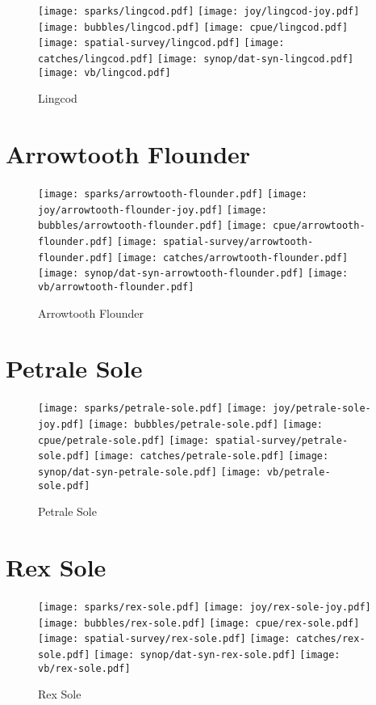 \begin{figure}[htbp]
\centering
\texttt{[image: sparks/lingcod.pdf]}
\texttt{[image: joy/lingcod-joy.pdf]}
\texttt{[image: bubbles/lingcod.pdf]}
\texttt{[image: cpue/lingcod.pdf]}
\texttt{[image: spatial-survey/lingcod.pdf]}
\texttt{[image: catches/lingcod.pdf]}
\texttt{[image: synop/dat-syn-lingcod.pdf]}
\texttt{[image: vb/lingcod.pdf]}
\caption{Lingcod}
\end{figure}
\clearpage
\section{Arrowtooth Flounder}

\begin{figure}[htbp]
\centering
\texttt{[image: sparks/arrowtooth-flounder.pdf]}
\texttt{[image: joy/arrowtooth-flounder-joy.pdf]}
\texttt{[image: bubbles/arrowtooth-flounder.pdf]}
\texttt{[image: cpue/arrowtooth-flounder.pdf]}
\texttt{[image: spatial-survey/arrowtooth-flounder.pdf]}
\texttt{[image: catches/arrowtooth-flounder.pdf]}
\texttt{[image: synop/dat-syn-arrowtooth-flounder.pdf]}
\texttt{[image: vb/arrowtooth-flounder.pdf]}
\caption{Arrowtooth Flounder}
\end{figure}
\clearpage
\section{Petrale Sole}

\begin{figure}[htbp]
\centering
\texttt{[image: sparks/petrale-sole.pdf]}
\texttt{[image: joy/petrale-sole-joy.pdf]}
\texttt{[image: bubbles/petrale-sole.pdf]}
\texttt{[image: cpue/petrale-sole.pdf]}
\texttt{[image: spatial-survey/petrale-sole.pdf]}
\texttt{[image: catches/petrale-sole.pdf]}
\texttt{[image: synop/dat-syn-petrale-sole.pdf]}
\texttt{[image: vb/petrale-sole.pdf]}
\caption{Petrale Sole}
\end{figure}
\clearpage
\section{Rex Sole}

\begin{figure}[htbp]
\centering
\texttt{[image: sparks/rex-sole.pdf]}
\texttt{[image: joy/rex-sole-joy.pdf]}
\texttt{[image: bubbles/rex-sole.pdf]}
\texttt{[image: cpue/rex-sole.pdf]}
\texttt{[image: spatial-survey/rex-sole.pdf]}
\texttt{[image: catches/rex-sole.pdf]}
\texttt{[image: synop/dat-syn-rex-sole.pdf]}
\texttt{[image: vb/rex-sole.pdf]}
\caption{Rex Sole}
\end{figure}
\clearpage
